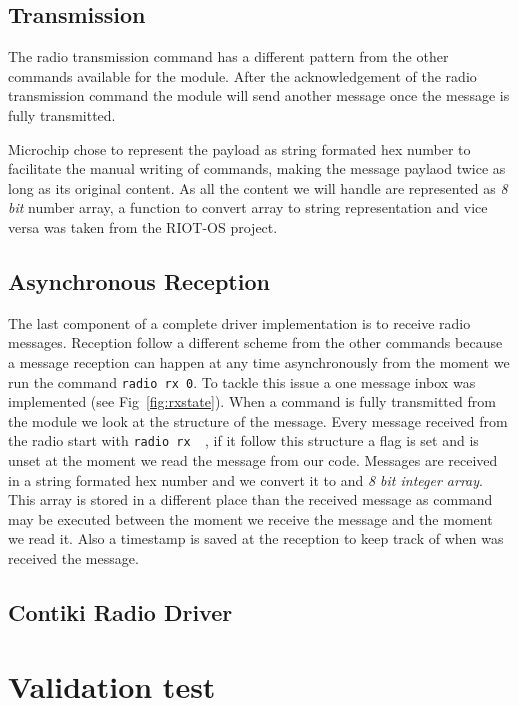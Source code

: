 

\subsection{Transmission}

The radio transmission command has a different pattern from the other commands 
available for the module. After the acknowledgement of the radio transmission 
command the module will send another message once the message is fully
transmitted.



Microchip chose to represent the payload as string formated hex number to
facilitate the manual writing of commands, making the message paylaod twice as
long as its original content. As all the content we will handle 
are represented as \emph{8 bit} number array, a function to convert array to
string representation and vice versa was taken from the RIOT-OS project.

\subsection{Asynchronous Reception}

The last component of a complete driver implementation is to receive radio
messages.
Reception follow a different scheme from the other commands because a message
reception can happen at any time asynchronously from the moment we run the
command \lstinline{radio rx 0}.
To tackle this issue a one message inbox was implemented (see
Fig~\ref{fig:rxstate}).
When a command is fully transmitted from the module we look at the structure of
the message. Every message received from the radio start with \lstinline{radio rx  }, if it follow this structure a flag is set and is unset at the moment we
read the message from our code.
Messages are received in a string formated hex number and we convert it to and \emph{8
bit integer array}. This array is stored in a different place than the received
message as command may be executed between the moment we receive the message and
the moment we read it.
Also a timestamp is saved at the reception to keep track of when was received the
message.



\subsection{Contiki Radio Driver}

\section{Validation test}

